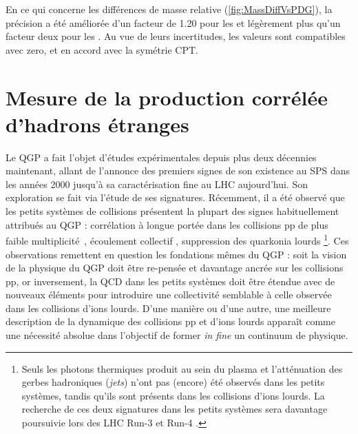 En ce qui concerne les différences de masse relative (\figs\ref{fig:MassDiffVsPDG}), la précision a été améliorée d'un facteur de 1.20 pour les \rmXiPM et légèrement plus qu'un facteur deux pour les \rmOmegaPM. Au vue de leurs incertitudes, les valeurs sont compatibles avec zero, et en accord avec la symétrie CPT.



\chapter{Mesure de la production corrélée d'hadrons étranges}

Le QGP a fait l'objet d'études expérimentales depuis plus deux décennies maintenant, allant de l'annonce des premiers signes de son existence au SPS dans les années 2000 jusqu'à sa caractérisation fine au LHC aujourd'hui. Son exploration se fait via l'étude de ses signatures. Récemment, il a été observé que les petits systèmes de collisions présentent la plupart des signes habituellement attribués au QGP : corrélation à longue portée dans les collisions pp de plus faible multiplicité~\cite{alicecollaborationALICESeesRidge}, écoulement collectif \cite{cmscollaborationEvidenceCollectiveMultiparticle2015, alicecollaborationAnisotropicFlowFlow2023}, suppression des quarkonia lourds \cite{singhCharmoniumSuppressionUltrarelativistic2022}\footnote{Seuls les photons thermiques produit au sein du plasma et l'atténuation des gerbes hadroniques (\textit{jets}) n'ont pas (encore) été observés dans les petits systèmes, tandis qu'ils sont présents dans les collisions d'ions lourds. La recherche de ces deux signatures dans les petits systèmes sera davantage poursuivie lors des LHC Run-3 et Run-4 \cite{vanleeuwenHighlightsALICE59th2023}.}. Ces observations remettent en question les fondations mêmes du QGP : soit la vision de la physique du QGP doit être re-pensée et davantage ancrée sur les collisions pp, or inversement, la QCD dans les petits systèmes doit être étendue avec de nouveaux éléments pour introduire une collectivité semblable à celle observée dans les collisions d'ions lourds. D'une manière ou d'une autre, une meilleure description de la dynamique des collisions pp et d'ions lourds apparaît comme une nécessité absolue dans l'objectif de former \textit{in fine} un continuum de physique.

